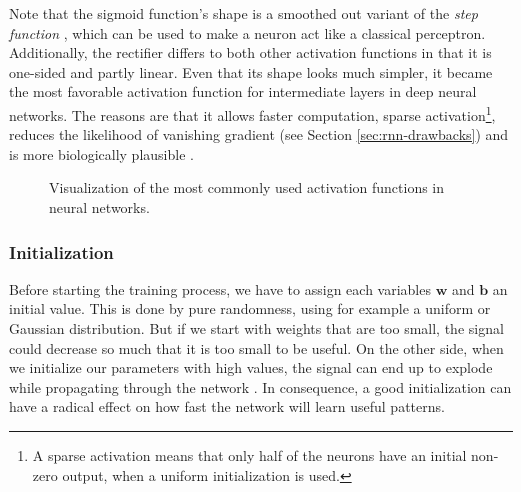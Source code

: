 Note that the sigmoid function's shape is a smoothed out variant of the \textit{step function} \parencite{neural_nets_deep_learning}, which can be used to make a neuron act like a classical perceptron. Additionally, the rectifier differs to both other activation functions in that it is one-sided and partly linear. Even that its shape looks much simpler, it became the most favorable activation function for intermediate layers in deep neural networks. The reasons are that it allows faster computation, sparse activation\footnote{{A sparse activation means that only half of the neurons have an initial non-zero output, when a uniform initialization is used.}}, reduces the likelihood of vanishing gradient (see Section \ref{sec:rnn-drawbacks}) and is more biologically plausible \parencite{relu}.

\begin{figure}[htpb]
  \centering
  \caption[Activation functions]{Visualization of the most commonly used activation functions in neural networks.}\label{fig:activations}
\end{figure}

\subsubsection{Initialization}

Before starting the training process, we have to assign each variables $ \textbf{w} $ and $ \textbf{b} $ an initial value. This is done by pure randomness, using for example a uniform or Gaussian distribution. But if we start with weights that are too small, the signal could decrease so much that it is too small to be useful. On the other side, when we initialize our parameters with high values, the signal can end up to explode while propagating through the network \parencite{understand_xavier}. In consequence, a good initialization can have a radical effect on how fast the network will learn useful patterns.

